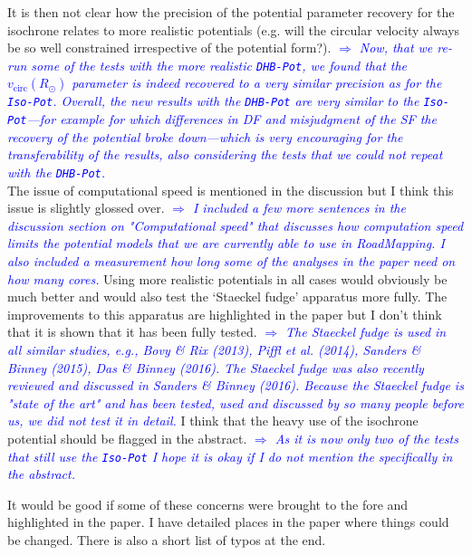 \documentclass[10pt,a4paper]{article}
\newcommand{\Comment}[1]{\textsl{\textcolor{Blue}{$\Longrightarrow$ {#1}}}}
\newcommand{\RM}{{\sl RoadMapping}}
\begin{document}
\begin{itemize}
It is then not clear how the precision of the potential parameter recovery for the isochrone relates to more realistic potentials (e.g. will the circular velocity always be so well constrained irrespective of the potential form?). \Comment{Now, that we re-run some of the tests with the more realistic \texttt{DHB-Pot}, we found that the $v_\text{circ}(R_\odot)$ parameter is indeed recovered to a very similar precision as for the \texttt{Iso-Pot}. Overall, the new results with the \texttt{DHB-Pot} are very similar to the \texttt{Iso-Pot}---for example for which differences in DF and misjudgment of the SF the recovery of the potential broke down---which is very encouraging for the transferability of the results, also considering the tests that we could not repeat with the \texttt{DHB-Pot}.}\\
The issue of computational speed is mentioned in the discussion but I think this issue is slightly glossed over. \Comment{I included a few more sentences in the discussion section on "Computational speed" that discusses how computation speed limits the potential models that we are currently able to use in \RM{}. I also included a measurement how long some of the analyses in the paper need on how many cores.}
Using more realistic potentials in all cases would obviously be much better and would also test the `Staeckel fudge'
apparatus more fully. The improvements to this apparatus are highlighted in the paper but I don't think that it is shown that it has been fully tested. \Comment{The \emph{Staeckel fudge} is used in all similar studies, e.g., Bovy \& Rix (2013), Piffl et al. (2014), Sanders \& Binney (2015), Das \& Binney (2016). The \emph{Staeckel fudge} was also recently reviewed and discussed in Sanders \& Binney (2016). Because the \emph{Staeckel fudge} is "state of the art" and has been tested, used and discussed by so many people before us, we did not test it in detail.} I think that the heavy use of the isochrone potential should be flagged in the abstract. \Comment{As it is now only two of the tests that still use the \texttt{Iso-Pot} I hope it is okay if I do not mention the \text{Iso-Pot} specifically in the abstract.}
\end{itemize}

It would be good if some of these concerns were brought to the fore and highlighted
in the paper. I have detailed places in the paper where things could be changed.
There is also a short list of typos at the end.\\\\
\end{document}
